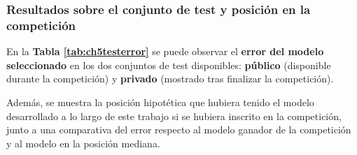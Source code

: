 \subsubsection{Resultados sobre el conjunto de test y posición en la competición}

En la \textbf{Tabla \ref{tab:ch5testerror}} se puede observar el \textbf{error del modelo seleccionado} en los dos conjuntos de test disponibles: \textbf{público} (disponible durante la competición) y \textbf{privado} (mostrado tras finalizar la competición).

Además, se muestra la posición hipotética que hubiera tenido el modelo desarrollado a lo largo de este trabajo si se hubiera inscrito en la competición, junto a una comparativa del error respecto al modelo ganador de la competición y al modelo en la posición mediana.

\begin{table}[h]
	\vspace{-4mm}
	\centering
	\captionsetup{justification=centering}
	\caption{Error del modelo seleccionado en el conjunto de test}
	\label{tab:ch5testerror}
\end{table}

